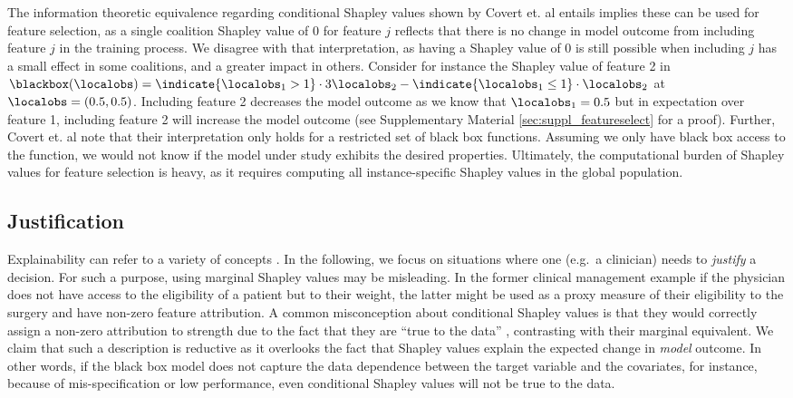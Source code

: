 \documentclass[nohyperref]{article}
\theoremstyle{plain}
\theoremstyle{definition}
\theoremstyle{remark}
\begin{document}
The information theoretic equivalence regarding conditional Shapley values shown by Covert et. al  entails implies these can be used for feature selection, as a single coalition Shapley value of 0 for feature $j$ reflects that there is no change in model outcome from including feature $j$ in the training process. We disagree with that interpretation, as having a Shapley value of 0 is still possible when including $j$ has a small effect in some coalitions, and a greater impact in others. Consider for instance the Shapley value of feature 2 in  $\blackbox(\localobs)=\indicate{\localobs_{1}>1}\cdot 3\localobs_{2}-\indicate{\localobs_{1}\leq 1}\cdot \localobs_{2}$ at $\localobs=(0.5, 0.5)$. Including feature 2 decreases the model outcome as we know that $\localobs_1=0.5$ but in expectation over feature 1, including feature 2 will increase the model outcome (see Supplementary Material \ref{sec:suppl_featureselect} for a proof).
Further, Covert et. al  note that their interpretation only holds for a restricted set of black box functions. Assuming we only have black box access to the function, we would not know if the model under study exhibits the desired properties. Ultimately, the computational burden of Shapley values for feature selection is heavy, as it requires computing all instance-specific Shapley values in the global population.

\subsection{Justification} 

Explainability can refer to a variety of concepts \cite{adadi2018peeking}. In the following, we focus on situations where one (e.g.~a clinician) needs to \emph{justify} a decision. For such a purpose, using marginal Shapley values may be misleading. In the former clinical management example if the physician does not have access to the eligibility of a patient but to their weight, the latter might be used as a proxy measure of their eligibility to the surgery and have non-zero feature attribution. A common misconception about conditional Shapley values is that they would correctly assign a non-zero attribution to strength due to the fact that they are ``true to the data'' \cite{chen2020true}, contrasting with their marginal equivalent. We claim that such a description is reductive as it overlooks the fact that Shapley values explain the expected change in \textit{model} outcome. In other words, if the black box model does not capture the data dependence between the target variable and the covariates, for instance, because of mis-specification or low performance, even conditional Shapley values will not be true to the data. 
\end{document}
